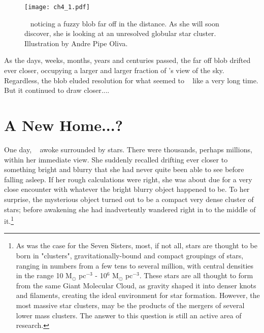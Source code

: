 \documentclass[main.tex]{subfiles}
\begin{document}
\begin{figure}
\texttt{[image: ch4\_1.pdf]}
\caption{\rmsterope~ noticing a fuzzy blob far off in the distance.  As she will soon discover, she is looking at an unresolved globular star cluster.  Illustration by Andre Pipe Oliva.
\label{fig:fig1}}
\end{figure}



\par \nar As the days, weeks, months, years and centuries passed, the far off blob drifted ever closer, occupying a larger and larger fraction of \rmsterope's view of the sky.  Regardless, the blob eluded resolution for what seemed to \rmsterope~ like a very long time.  But it continued to draw closer....

\section{A New Home...?}

\par \nar One day, \rmsterope~  awoke surrounded by stars.  There were thousands, perhaps millions, within her immediate view.  She suddenly recalled drifting ever closer to something bright and blurry that she had never quite been able to see before falling asleep.  If her rough calculations were right, she was about due for a very close encounter with whatever the bright blurry object happened to be.  To her surprise, the mysterious object turned out to be a compact very dense cluster of stars; before awakening she had inadvertently wandered right in to the middle of it.\footnote{As was the case for the Seven Sisters, most, if not all, stars are thought to be born in "clusters", gravitationally-bound and compact groupings of stars, ranging in numbers from a few tens to several million, with central densities in the range 10 M$_{\odot}$ pc$^{-3}$ - 10$^6$ M$_{\odot}$ pc$^{-3}$.  These stars are all thought to form from the same Giant Molecular Cloud, as gravity shaped it into denser knots and filaments, creating the ideal environment for star formation.  However, the most massive star clusters, may be the products of the mergers of several lower mass clusters.  The answer to this question is still an active area of research.}
\end{document}
